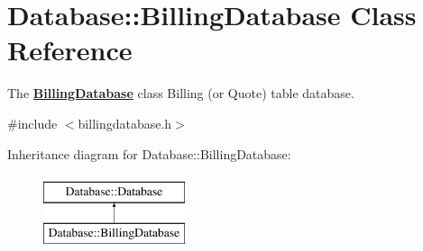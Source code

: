 \hypertarget{classDatabase_1_1BillingDatabase}{\section{Database\+:\+:Billing\+Database Class Reference}
\label{classDatabase_1_1BillingDatabase}
}


The {\bfseries \hyperlink{classDatabase_1_1BillingDatabase}{Billing\+Database}} class Billing (or Quote) table database.  




{\ttfamily \#include $<$billingdatabase.\+h$>$}

Inheritance diagram for Database\+:\+:Billing\+Database\+:\begin{figure}[H]
\begin{center}
\leavevmode
\includegraphics[height=2.000000cm]{d2/d86/classDatabase_1_1BillingDatabase}
\end{center}
\end{figure}
